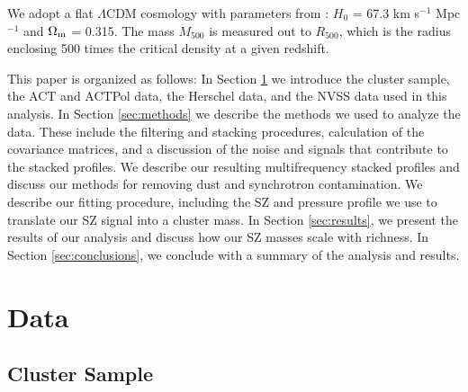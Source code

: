 \documentclass[a4paper,fleqn,usenatbib]{mnras}
\begin{document}
We adopt a flat $\Lambda$CDM cosmology with parameters from  \cite{2011A&A...536A..13P}: $H_{0}$ = 67.3 km s$^{-1}$ Mpc$^{-1}$ and $\Omega_{\rm m}$ = 0.315. 
The  mass $M_{500}$ is measured out to $R_{500}$, which is the radius enclosing 500 times the critical density at a given redshift.


This paper is organized as follows: In Section \ref{sec:data} we introduce the cluster sample, the ACT and ACTPol data, the Herschel data, and the NVSS data used in this analysis. 
In Section \ref{sec:methods} we describe the methods we used to analyze the data. 
These include the filtering and stacking procedures, calculation of the covariance matrices, and a discussion of the noise and signals that contribute to the stacked profiles. 
We describe our resulting multifrequency stacked profiles 
and discuss our methods for removing dust and synchrotron contamination. 
We describe our fitting procedure, including the SZ and pressure profile we use to translate our SZ signal into a cluster mass. 
In Section \ref{sec:results}, we present the results of our analysis and discuss how our SZ masses scale with richness. 
In Section \ref{sec:conclusions}, we conclude with a summary of the analysis and results.


\section{Data} \label{sec:data}

\subsection{Cluster Sample}
\end{document}
